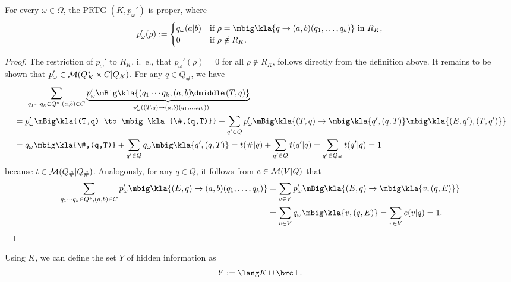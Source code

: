 \begin{lemma}
 For every $\omega\in\Omega$, the PRTG $(K,p_\omega')$ is proper, where
 \[
  p'_\omega(\rho) := \begin{cases}
   q_\omega(a|b) & \text{if } \rho=\mbig\kla{q\to(a,b)(q_1,\ldots,q_k)}\isin R_K, \\
   0 & \text{if } \rho\notin R_K.
  \end{cases}
 \]
\end{lemma}

\begin{proof}
 The restriction of $p_\omega'$ to $R_K$, i.~e., that $p_\omega'(\rho)=0$ for all
 $\rho\notin R_K$, follows directly from the definition above. It remains to be shown
 that $p_\omega'\in\mathcal M(Q_K^*\times C|Q_K)$. For any $q\in Q_\#$, we have
 \begin{align*}
  &\hspace{1.5em} \sum_{q_1\cdots q_k\in Q^*,(a,b)\in C} \underbrace{p_\omega'\mBig\kla{(q_1\cdots q_k,(a,b)\npipe(T,q)}}_{=\,p_\omega'((T,q)\to(a,b)(q_1,\ldots,q_k))} \\
  &= p_\omega'\mBig\kla{(T,q) \to \mbig\kla{\#,(q,T)}} + \sum_{q'\in Q} p_\omega'\mBig\kla{(T,q) \to \mbig\kla{q',(q,T)}\mbig\kla{(E,q'),(T,q')}} \\
  &= q_\omega\mbig\kla{\#,(q,T)} + \sum_{q'\in Q} q_\omega\mbig\kla{q',(q,T)} = t(\#|q) + \sum_{q'\in Q} t(q'|q) = \sum_{q'\in Q_\#} t(q'|q) = 1
 \end{align*}
 because $t\in\mathcal M(Q_\#|Q_\#)$. Analogously, for any $q\in Q$, it follows from $e\in\mathcal M(V|Q)$ that
 \begin{align*}
  \sum_{q_1\cdots q_k\in Q^*,(a,b)\in C} p_\omega'\mbig\kla{(E,q)\to(a,b)(q_1,\ldots,q_k)}
  &= \sum_{v\in V} p_\omega'\mBig\kla{(E,q) \to \mbig\kla{v,(q,E)}} \\
  &= \sum_{v\in V} q_\omega\mbig\kla{v,(q,E)} = \sum_{v\in V} e(v|q) = 1.
  \qedhere
 \end{align*}
\end{proof}

Using $K$, we can define the set $Y$ of hidden information as
\[
 Y := \lang K \cup \brc\bot.
\]

